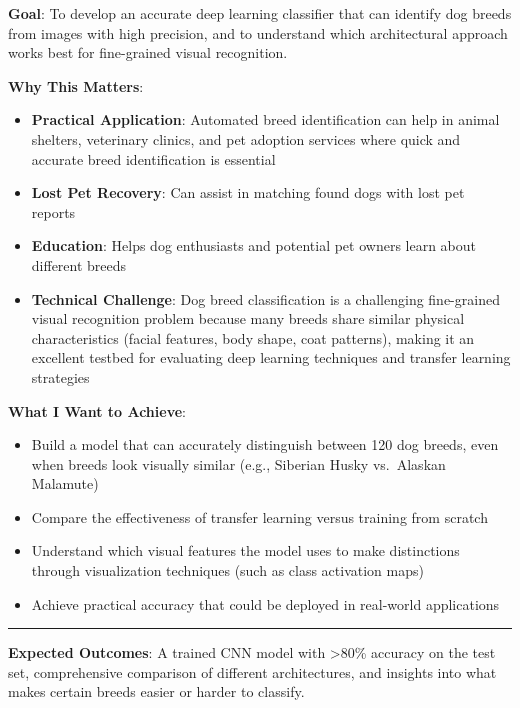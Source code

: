 \documentclass[
  letterpaper,
  DIV=11,
  numbers=noendperiod]{scrartcl}
\providecommand{\tightlist}{%
  \setlength{\itemsep}{0pt}\setlength{\parskip}{0pt}}
\begin{document}
\textbf{Goal}: To develop an accurate deep learning classifier that can
identify dog breeds from images with high precision, and to understand
which architectural approach works best for fine-grained visual
recognition.

\textbf{Why This Matters}:

\begin{itemize}
\tightlist
\item
  \textbf{Practical Application}: Automated breed identification can
  help in animal shelters, veterinary clinics, and pet adoption services
  where quick and accurate breed identification is essential
\item
  \textbf{Lost Pet Recovery}: Can assist in matching found dogs with
  lost pet reports
\item
  \textbf{Education}: Helps dog enthusiasts and potential pet owners
  learn about different breeds
\item
  \textbf{Technical Challenge}: Dog breed classification is a
  challenging fine-grained visual recognition problem because many
  breeds share similar physical characteristics (facial features, body
  shape, coat patterns), making it an excellent testbed for evaluating
  deep learning techniques and transfer learning strategies
\end{itemize}

\textbf{What I Want to Achieve}:

\begin{itemize}
\tightlist
\item
  Build a model that can accurately distinguish between 120 dog breeds,
  even when breeds look visually similar (e.g., Siberian Husky
  vs.~Alaskan Malamute)
\item
  Compare the effectiveness of transfer learning versus training from
  scratch
\item
  Understand which visual features the model uses to make distinctions
  through visualization techniques (such as class activation maps)
\item
  Achieve practical accuracy that could be deployed in real-world
  applications
\end{itemize}

\begin{center}\rule{0.5\linewidth}{0.5pt}\end{center}

\textbf{Expected Outcomes}: A trained CNN model with \textgreater80\%
accuracy on the test set, comprehensive comparison of different
architectures, and insights into what makes certain breeds easier or
harder to classify.
\end{document}
